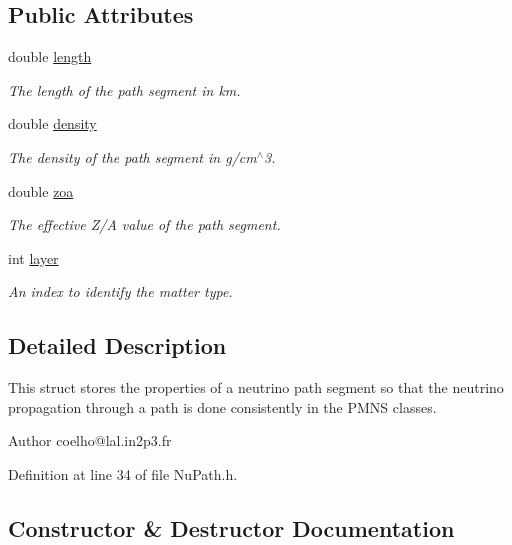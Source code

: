 \subsection*{Public Attributes}
\begin{DoxyCompactItemize}
\item 
double \hyperlink{structOscProb_1_1NuPath_af22660894b6e25cf835500381b155557}{length}
\begin{DoxyCompactList}\small\item\em The length of the path segment in km. \end{DoxyCompactList}\item 
double \hyperlink{structOscProb_1_1NuPath_a54ddd451db69bc54434de3cf18a117ca}{density}
\begin{DoxyCompactList}\small\item\em The density of the path segment in g/cm$^\wedge$3. \end{DoxyCompactList}\item 
double \hyperlink{structOscProb_1_1NuPath_af3213f3691ba83c6bc05f4a3490f6b31}{zoa}
\begin{DoxyCompactList}\small\item\em The effective Z/A value of the path segment. \end{DoxyCompactList}\item 
int \hyperlink{structOscProb_1_1NuPath_a442b160899e554ad1d800989510d5309}{layer}
\begin{DoxyCompactList}\small\item\em An index to identify the matter type. \end{DoxyCompactList}\end{DoxyCompactItemize}


\subsection{Detailed Description}
This struct stores the properties of a neutrino path segment so that the neutrino propagation through a path is done consistently in the P\+M\+NS classes.

\begin{DoxyAuthor}{Author}
coelho@lal.\+in2p3.\+fr 
\end{DoxyAuthor}


Definition at line 34 of file Nu\+Path.\+h.



\subsection{Constructor \& Destructor Documentation}
\mbox{\label{structOscProb_1_1NuPath_a1cc885eb24b3152596ac2f8500f81ae6}} 
